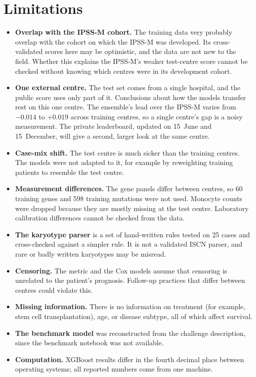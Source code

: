 \documentclass[11pt,a4paper]{article}
\begin{document}
\section{Limitations}
\begin{itemize}
  \item \textbf{Overlap with the IPSS-M cohort.} The training data very probably overlap
        with the cohort on which the IPSS-M was developed. Its cross-validated scores here
        may be optimistic, and the data are not new to the field. Whether this explains the
        IPSS-M's weaker test-centre score cannot be checked without knowing which centres
        were in its development cohort.
  \item \textbf{One external centre.} The test set comes from a single hospital, and the
        public score uses only part of it. Conclusions about how the models transfer rest
        on this one centre. The ensemble's lead over the IPSS-M varies from $-0.014$ to
        $+0.019$ across training centres, so a single centre's gap is a noisy measurement.
        The private leaderboard, updated on 15~June and 15~December, will give a second,
        larger look at the same centre.
  \item \textbf{Case-mix shift.} The test centre is much sicker than the training centres.
        The models were not adapted to it, for example by reweighting training patients to
        resemble the test centre.
  \item \textbf{Measurement differences.} The gene panels differ between centres, so 60
        training genes and 598 training mutations were not used. Monocyte counts were
        dropped because they are mostly missing at the test centre. Laboratory calibration
        differences cannot be checked from the data.
  \item \textbf{The karyotype parser} is a set of hand-written rules tested on 25 cases and
        cross-checked against a simpler rule. It is not a validated ISCN parser, and rare
        or badly written karyotypes may be misread.
  \item \textbf{Censoring.} The metric and the Cox models assume that censoring is unrelated
        to the patient's prognosis. Follow-up practices that differ between centres could
        violate this.
  \item \textbf{Missing information.} There is no information on treatment (for example,
        stem cell transplantation), age, or disease subtype, all of which affect survival.
  \item \textbf{The benchmark model} was reconstructed from the challenge description, since
        the benchmark notebook was not available.
  \item \textbf{Computation.} XGBoost results differ in the fourth decimal place between
        operating systems; all reported numbers come from one machine.
\end{itemize}
\end{document}
